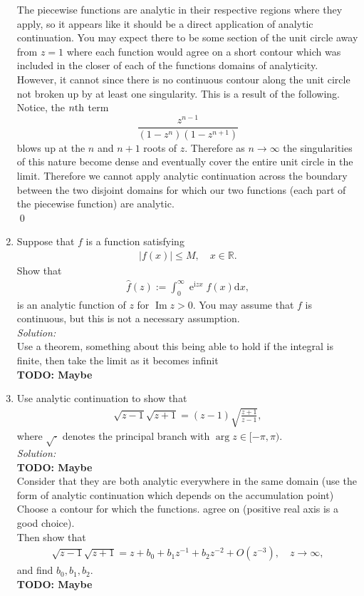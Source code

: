 \documentclass[10pt]{amsart}
\newcommand{\D}{\mathrm{d}}
\newcommand{\I}{\mathrm{i}}
\DeclareMathOperator{\E}{e}
\DeclareMathOperator{\imag}{Im}
\theoremstyle{nonumberplain}
\begin{document}
\begin{enumerate}[label={\bf {\arabic*}:}]
\noindent
The piecewise functions are analytic in their respective regions where they apply, so it appears like it should be a direct application of analytic continuation.
You may expect there to be some section of the unit circle away from $z = 1$ where each function would agree on a short contour which was included in the closer of each of the functions domains of analyticity.
However, it cannot since there is no continuous contour along the unit circle not broken up by at least one singularity.
This is a result of the following.
Notice, the $n{\rm th}$ term 
$$
\frac{z^{n-1}}{\left(1-z^n\right)\left(1-z^{n+1}\right)}
$$
blows up at the $n$ and $n + 1$ roots of $z$.
Therefore as $n \rightarrow \infty$ the singularities of this nature become dense and eventually cover the entire unit circle in the limit.
Therefore we cannot apply analytic continuation across the boundary between the two disjoint domains for which our two functions (each part of the piecewise function) are analytic. \\
\qed

\newpage

\item Suppose that $f$ is a function satisfying
  \begin{align*}
    |f(x)| \leq M, \quad x \in \mathbb R.
  \end{align*}
  Show that
  \begin{align*}
    \hat f(z) := \int_0^\infty \E^{\I z x} f(x) \D x,
  \end{align*}
  is an analytic function of $z$ for $\imag z > 0$.  You may assume
  that $f$ is continuous, but this is not a necessary assumption.\\
  
\noindent
\textit{Solution:} \\
Use a theorem, something about this being able to hold if the integral is finite, then take the limit as it becomes infinit \\
\textbf{TODO: Maybe}
\newpage

\item Use analytic continuation to show that
  \begin{align*}
    \sqrt{z -1} \sqrt{z + 1} = (z -1) \sqrt{ \frac{ z +1}{z-1}},
  \end{align*}
  where $\sqrt{\cdot}$ denotes the principal branch with $\arg z \in
  [-\pi, \pi)$. \\
  \textit{Solution:} \\
  \textbf{TODO: Maybe} \\
  Consider that they are both analytic everywhere in the same domain (use the form of analytic continuation which depends on the accumulation point) \\
  Choose a contour for which the functions. agree on (positive real axis is a good choice). \\
  
  \noindent
  Then show that
  \begin{align*}
    \sqrt{z -1} \sqrt{z + 1} = z + b_0 + b_1 z^{-1} + b_2  z^{-2} +
    O(z^{-3}), \quad z \to \infty,
  \end{align*}
  and find $b_0,b_1,b_2$. \\
  \textbf{TODO: Maybe}
  
\end{enumerate}
\end{document}
